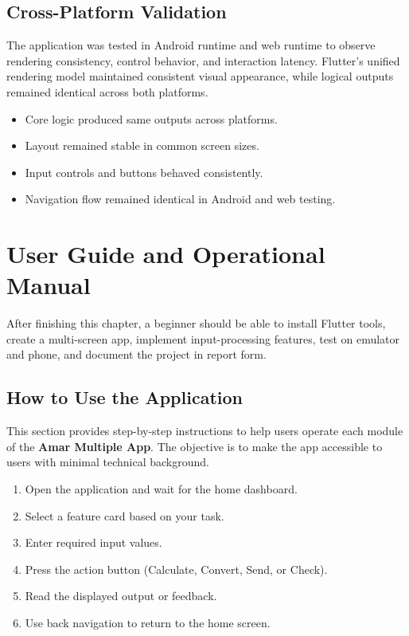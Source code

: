 \documentclass{article}
\begin{document}
\subsection{Cross-Platform Validation}
The application was tested in Android runtime and web runtime to observe rendering consistency, control behavior, and interaction latency. Flutter's unified rendering model maintained consistent visual appearance, while logical outputs remained identical across both platforms.

\begin{reportbox}
\begin{itemize}
\item Core logic produced same outputs across platforms.
\item Layout remained stable in common screen sizes.
\item Input controls and buttons behaved consistently.
\item Navigation flow remained identical in Android and web testing.
\end{itemize}
\end{reportbox}

\newpage
\section{User Guide and Operational Manual}

\begin{insightbox}
After finishing this chapter, a beginner should be able to install Flutter tools, create a multi-screen app, implement input-processing features, test on emulator and phone, and document the project in report form.
\end{insightbox}

\subsection{How to Use the Application}
This section provides step-by-step instructions to help users operate each module of the \textbf{Amar Multiple App}. The objective is to make the app accessible to users with minimal technical background.

\begin{reportbox}
\begin{enumerate}
\item Open the application and wait for the home dashboard.
\item Select a feature card based on your task.
\item Enter required input values.
\item Press the action button (Calculate, Convert, Send, or Check).
\item Read the displayed output or feedback.
\item Use back navigation to return to the home screen.
\end{enumerate}
\end{reportbox}
\end{document}
